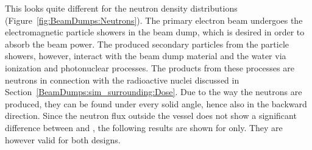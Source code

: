 This looks quite different for the neutron density distributions (Figure~\ref{fig:BeamDumps:Neutrons}).
 The primary electron beam undergoes the electromagnetic particle showers in the beam dump, which is desired in order to absorb the beam power.
 The produced secondary particles from the particle showers, however, interact with the beam dump material and the water via ionization and photonuclear processes.
 The products from these processes are neutrons in connection with the radioactive nuclei discussed in Section~\ref{BeamDumps:sim_surrounding:Dose}.
 Due to the way the neutrons are produced, they can be found under every solid angle, hence also in the backward direction.
 Since the neutron flux outside the vessel does not show a significant difference between \designone and \designtwo, the following results are shown for \designone only.
 They are however valid for both designs.
